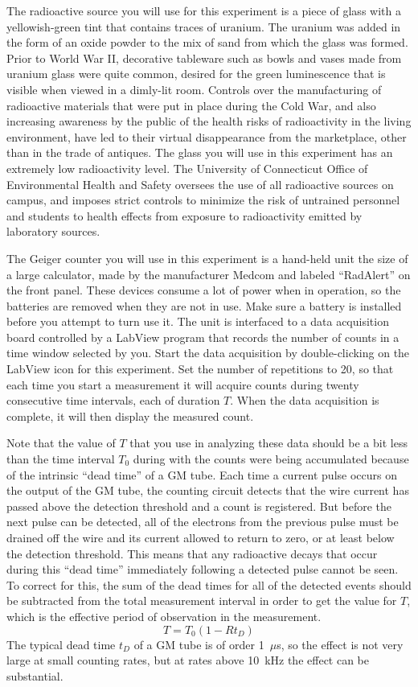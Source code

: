 \documentclass{revtex4}
\begin{document}
The radioactive source you will use for this experiment is a piece of
glass with a yellowish-green tint that contains traces of uranium.  The
uranium was added in the form of an oxide powder to the mix of sand from
which the glass was formed.  Prior to World War II, decorative tableware
such as bowls and vases made from uranium glass were quite common, desired
for the green luminescence that is visible when viewed in a dimly-lit room.
Controls over the manufacturing of radioactive materials that were put in
place during the Cold War, and also increasing awareness by the public of
the health risks of radioactivity in the living environment, have led to
their virtual disappearance from the marketplace, other than in the trade
of antiques.  The glass you will use in this experiment has an extremely
low radioactivity level.  The University of Connecticut Office of
Environmental Health and Safety oversees the use of all radioactive sources
on campus, and imposes strict controls to minimize the risk of untrained
personnel and students to health effects from exposure to radioactivity
emitted by laboratory sources.

The Geiger counter you will use in this experiment is a hand-held unit
the size of a large calculator, made by the manufacturer Medcom and labeled
``RadAlert'' on the front panel.  These devices consume a lot of power when
in operation, so the batteries are removed when they are not in use.  Make
sure a battery is installed before you attempt to turn use it.
The unit is interfaced to a data acquisition board controlled by a LabView
program that records the number of counts in a time window selected by you.
Start the data acquisition by double-clicking on the LabView icon for this
experiment.  Set the number of repetitions to 20, so that each time you
start a measurement it will acquire counts during twenty consecutive time
intervals, each of duration $T$.  When the data acquisition is complete,
it will then display the measured count.

Note that the value of $T$ that you use in analyzing these data should be
a bit less than the time interval $T_0$ during with the counts were being
accumulated because of the intrinsic ``dead time'' of a GM tube.  Each time
a current pulse occurs on the output of the GM tube, the counting circuit
detects that the wire current has passed above the detection threshold
and a count is registered.  But before the next pulse can be detected, all of
the electrons from the previous pulse must be drained off the wire and
its current allowed to return to zero, or at least below the detection
threshold.  This means that any radioactive decays that occur during this
``dead time'' immediately following a detected pulse cannot be seen.  To
correct for this, the sum of the dead times for all of the detected events
should be subtracted from the total measurement interval in order to get
the value for $T$, which is the effective period of observation in the
measurement.
\begin{equation}
T=T_0(1-Rt_D)
\label{eq:deadtime}
\end{equation}
The typical dead time $t_D$ of a GM tube is of order 1~$\mu$s,
so the effect is not very large at small counting rates, but at rates above
10~kHz the effect can be substantial.
\end{document}
